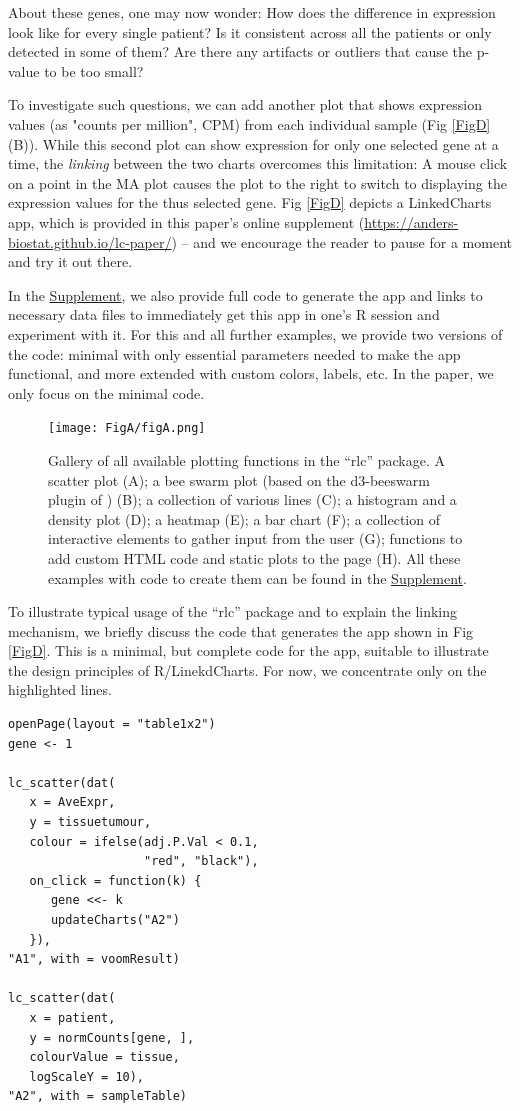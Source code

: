 \documentclass[twocolumn,10pt]{article}
\newcommand{\Supplement}{\href{https://anders-biostat.github.io/lc-paper/}{Supplement}}
\begin{document}
About these genes, one may now wonder: How does the difference in expression look like for every single patient? Is it consistent across all the patients or only detected in some of them? Are there any artifacts or outliers that cause the p-value to be too small?

To investigate such questions, we can add another plot that shows expression values (as "counts per million", CPM) from each individual sample (Fig \ref{FigD}(B)). While this second plot can show expression for only one selected gene at a time, the \emph{linking} between the two charts  overcomes this limitation: A mouse click on a point in the MA plot causes the plot to the right to switch to displaying the expression values for the thus selected gene. Fig \ref{FigD} depicts a LinkedCharts app, which is provided in this paper's online supplement (\url{https://anders-biostat.github.io/lc-paper/}) -- and we encourage the reader to pause for a moment and try it out there. 

In the \Supplement, we also provide full code to generate the app and links to necessary data files to immediately get this app in one's R session and experiment with it. For this and all further examples, we provide two versions of the code: minimal with only essential parameters needed to make the app functional, and more extended with custom colors, labels, etc. In the paper, we only focus on the minimal code.

\begin{figure}[b]
	\texttt{[image: FigA/figA.png]}
	\caption{Gallery of all available plotting functions in the ``rlc'' package. A scatter plot (A); a bee swarm plot (based on the d3-beeswarm plugin of \citet{lebeau_2017}) (B); a collection of various lines (C); a histogram and a density plot (D); a heatmap (E); a bar chart (F); a collection of interactive elements to gather input from the user (G); functions to add custom HTML code and static plots to the page (H). All these examples with code to create them can be found in the \Supplement.}
	\label{FigA}
\end{figure}

To illustrate typical usage of the ``rlc'' package and to explain the linking mechanism, we briefly discuss the code that generates the app shown in Fig \ref{FigD}. This is a minimal, but complete code for the app, suitable to illustrate the design principles of R/LinekdCharts. For now, we concentrate only on the highlighted lines.

\begin{verbatim}
openPage(layout = "table1x2")
gene <- 1

lc_scatter(dat(
   x = AveExpr,
   y = tissuetumour,
   colour = ifelse(adj.P.Val < 0.1, 
                   "red", "black"),
   on_click = function(k) {
      gene <<- k
      updateCharts("A2")
   }),
"A1", with = voomResult)

lc_scatter(dat(
   x = patient,
   y = normCounts[gene, ],
   colourValue = tissue, 
   logScaleY = 10),
"A2", with = sampleTable)
\end{verbatim}
\end{document}
